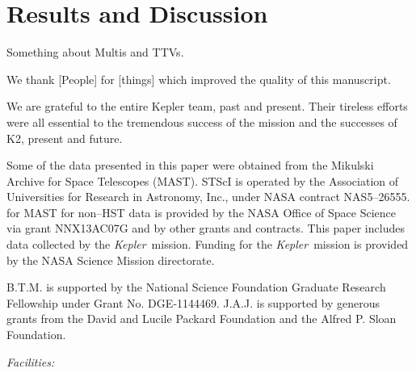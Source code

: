 \documentclass{emulateapj}
\newcommand{\project}[1]{\textsl{#1}}
\newcommand{\kep}{\project{Kepler}}
\newcommand{\todo}[3]{{\color{#2} \emph{#1} TO DO: #3}}
\newcommand{\btmtodo}[1]{\todo{BEN}{red}{#1}}
\begin{document}
\section{Results and Discussion}

Something about Multis and TTVs. 




\acknowledgements
We thank [People] for [things] which improved the quality of this manuscript.


We are grateful to the entire Kepler team, past and present. 
Their tireless efforts were all essential to the tremendous success of the mission and the successes of K2, present and future.


Some of the data presented in this paper were obtained from the Mikulski
Archive for Space Telescopes (MAST). 
STScI is operated by the Association of Universities for Research 
in Astronomy, Inc., under NASA contract NAS5--26555. 
for MAST for non--HST data is provided by the NASA Office of Space 
Science via grant NNX13AC07G and by other grants and contracts. 
This paper includes data collected by the \kep\ mission. 
Funding for the \kep\ mission is provided by the NASA Science 
Mission directorate.

B.T.M. is supported by the National Science Foundation Graduate Research
Fellowship under Grant No. DGE‐1144469. 
J.A.J. is supported by generous grants from the David and Lucile Packard
Foundation and the Alfred P. Sloan Foundation.



{\it Facilities:} %




\end{document}
